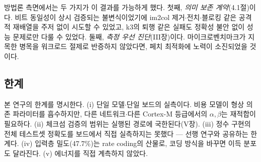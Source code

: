 방법론 측면에서는 두 가지가 이 결과를 가능하게 했다.
첫째, \emph{의미 보존 계약}(4.1절)이다. 비트 동일성이 상시
검증되는 불변식이었기에 im2col 제거$\cdot$전치$\cdot$블로킹 같은
공격적 재배열을 주저 없이 시도할 수 있었고, k3의 퇴행 같은 실패도
정확성 불안 없이 성능 문제로만 다룰 수 있었다. 둘째, \emph{측정
우선 진단}(III장)이다. 마이크로벤치마크가 지목한 병목을 워크로드
절제로 반증하지 않았다면, 페치 최적화에 노력이 소진되었을 것이다.

\subsection{한계}\label{sec:limits}

본 연구의 한계를 명시한다. (i) 단일 모델$\cdot$단일 보드의
실측이다. 비용 모델이 형상 의존 파라미터를 흡수하지만, 다른
네트워크$\cdot$다른 Cortex-M 등급에서의 $\alpha,\beta$는 재적합이
필요하다. (ii) 체크섬 검증의 범위는 실행된 경로에
국한된다(V장). (iii) 정수 구현의 전체 테스트셋 정확도를 보드에서
직접 실측하지는 못했다 --- 선행 연구와 공유하는 한계다. (iv) 입력층
밀도(47.7\%)는 rate coding의 산물로, 코딩 방식을 바꾸면 이득
분포도 달라진다. (v) 에너지를 직접 계측하지 않았다.
